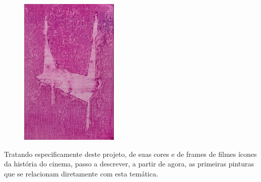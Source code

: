 \begin{figure}
	\caption{}

	\includegraphics[width=1.85297in,height=2.81553in]{figuras/boudet-memoria-inercia-2021.pdf.compressed.pdf}
\end{figure}

\pagebreak

Tratando especificamente deste projeto, de suas cores e de frames de
filmes ícones da história do cinema, passo a descrever, a partir de
agora, as primeiras pinturas que se relacionam diretamente com esta
temática.

